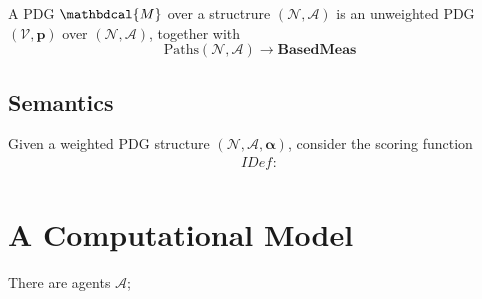 \documentclass[twoside]{article} %
\theoremstyle{plain}
\theoremstyle{definition}
\newcommand{\BaseMeas}{\mathbf{BasedMeas}}
\newcommand{\mat}[1]{\mathbf{#1}}
\newcommand{\V}{\mathcal V}
\newcommand{\N}{\mathcal N}
\newcommand{\Ar}{\mathcal A}
\newcommand{\balpha}{\boldsymbol\alpha}
\newcommand{\dg}[1]{\mathbdcal{#1}}
\newcommand{\IDef}[1]{\mathit{IDef}_{\!#1}}
\begin{document}
    
    \begin{defn}[PDG]
        A PDG $\dg M$ over a structrure $(\N, \Ar)$ is an unweighted PDG $(\V, \mat p)$ over $(\N, \Ar)$, together with 
        \[ 
            \mathrm{Paths}(\N, \Ar) \to \BaseMeas
        \]
    \end{defn}
    
    
    \subsection{Semantics}
    Given a weighted PDG structure $(\N, \Ar, \balpha)$, consider the scoring function 
    \begin{align*}
        \IDef{} : 
    \end{align*}

    
    
    \section{A Computational Model}
    There are agents $\mathcal A$; 
    \begin{center}
        \begin{tikzpicture}
            
        \end{tikzpicture}
    \end{center}
    
    
\end{document}
